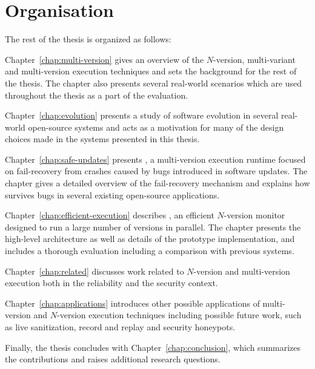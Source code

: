 \section{Organisation}
\label{overview:organisation}

The rest of the thesis is organized as follows:

\begin{chapterdescription}
\item[Chapter~\ref{chap:multi-version}] gives an overview of the $N$-version,
  multi-variant and multi-version execution techniques and sets the background
  for the rest of the thesis. The chapter also presents several real-world
  scenarios which are used throughout the thesis as a part of the evaluation.

\item[Chapter~\ref{chap:evolution}] presents a study of software evolution in
  several real-world open-source systems and acts as a motivation for many of
  the design choices made in the systems presented in this thesis.

\item[Chapter~\ref{chap:safe-updates}] presents \mx, a multi-version execution
  runtime focused on fail-recovery from crashes caused by bugs introduced in
  software updates. The chapter gives a detailed overview of the fail-recovery
  mechanism and explains how \mx survives bugs in several existing open-source
  applications.

\item[Chapter~\ref{chap:efficient-execution}] describes \varan, an efficient
  $N$-version monitor designed to run a large number of versions in parallel.
  The chapter presents the high-level architecture as well as details of the
  prototype implementation, and includes a thorough evaluation including a
  comparison with previous systems.

\item[Chapter~\ref{chap:related}] discusses work related to $N$-version and
  multi-version execution both in the reliability and the security context.

\item[Chapter~\ref{chap:applications}] introduces other possible applications
  of multi-version and $N$-version execution techniques including possible
  future work, such as live sanitization, record and replay and security
  honeypots.
\end{chapterdescription}

Finally, the thesis concludes with Chapter~\ref{chap:conclusion}, which
summarizes the contributions and raises additional research questions.

